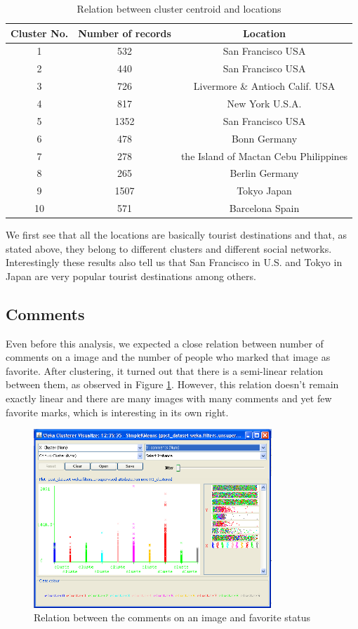 \documentclass[letter,12pt]{article}
\begin{document}
%
\begin{table}
\centering
\begin{tabular}{|c|c|c|}
\hline
Cluster No. & Number of records & Location\tabularnewline
\hline
\hline
1 & 532 & San Francisco USA\tabularnewline
\hline
2 & 440 & San Francisco USA\tabularnewline
\hline
3 & 726 & Livermore \& Antioch Calif. USA\tabularnewline
\hline
4 & 817 & New York U.S.A.\tabularnewline
\hline
5 & 1352 & San Francisco USA \tabularnewline
\hline
6 & 478 & Bonn Germany\tabularnewline
\hline
7 & 278 & the Island of Mactan Cebu Philippines\tabularnewline
\hline
8 & 265 & Berlin Germany\tabularnewline
\hline
9 & 1507 & Tokyo Japan \tabularnewline
\hline
10 & 571 & Barcelona Spain\tabularnewline
\hline
\end{tabular}
\caption{Relation between cluster centroid and locations}
\end{table}

We first see that all the locations are basically tourist destinations
and that, as stated above, they belong to different clusters and different
social networks. Interestingly these results also tell us that San
Francisco in U.S. and Tokyo in Japan are very popular tourist destinations
among others.

\subsection{Comments}

Even before this analysis, we expected a close relation between number
of comments on a image and the number of people who marked that image
as favorite. After clustering, it turned out that there is a semi-linear
relation between them, as observed in Figure \ref{Flo:comm_fav}.
However, this relation doesn't remain exactly linear and there are
many images with many comments and yet few favorite marks, which is
interesting in its own right.


\begin{figure}
\centering
\includegraphics[width=0.8\textwidth]{clusno_comm.png}
\caption{Relation between the comments on an image and favorite status}
\label{Flo:comm_fav}
\end{figure}
\end{document}
